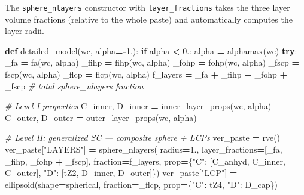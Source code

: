 \documentclass[
  a4paper,
  numbers=noendperiod,
  DIV=12]{scrreprt}
\newenvironment{Shaded}{\begin{snugshade}}{\end{snugshade}}
\newcommand{\CommentTok}[1]{\textcolor[rgb]{0.56,0.35,0.01}{\textit{#1}}}
\newcommand{\ControlFlowTok}[1]{\textcolor[rgb]{0.13,0.29,0.53}{\textbf{#1}}}
\newcommand{\FloatTok}[1]{\textcolor[rgb]{0.00,0.00,0.81}{#1}}
\newcommand{\KeywordTok}[1]{\textcolor[rgb]{0.13,0.29,0.53}{\textbf{#1}}}
\newcommand{\NormalTok}[1]{#1}
\newcommand{\OperatorTok}[1]{\textcolor[rgb]{0.81,0.36,0.00}{\textbf{#1}}}
\newcommand{\StringTok}[1]{\textcolor[rgb]{0.31,0.60,0.02}{#1}}
\begin{document}
The \texttt{sphere\_nlayers} constructor with \texttt{layer\_fractions}
takes the three layer volume fractions (relative to the whole paste) and
automatically computes the layer radii.

\begin{Shaded}
\begin{Highlighting}[]
\KeywordTok{def}\NormalTok{ detailed\_model(wc, alpha}\OperatorTok{={-}}\FloatTok{1.}\NormalTok{):}
    \ControlFlowTok{if}\NormalTok{ alpha }\OperatorTok{\textless{}} \FloatTok{0.}\NormalTok{: alpha }\OperatorTok{=}\NormalTok{ alphamax(wc)}
    \ControlFlowTok{try}\NormalTok{:}
\NormalTok{        \_fa   }\OperatorTok{=}\NormalTok{ fa(wc, alpha)}
\NormalTok{        \_fihp }\OperatorTok{=}\NormalTok{ fihp(wc, alpha)}
\NormalTok{        \_fohp }\OperatorTok{=}\NormalTok{ fohp(wc, alpha)}
\NormalTok{        \_fscp }\OperatorTok{=}\NormalTok{ fscp(wc, alpha)}
\NormalTok{        \_flcp }\OperatorTok{=}\NormalTok{ flcp(wc, alpha)}
\NormalTok{        f\_layers }\OperatorTok{=}\NormalTok{ \_fa }\OperatorTok{+}\NormalTok{ \_fihp }\OperatorTok{+}\NormalTok{ \_fohp }\OperatorTok{+}\NormalTok{ \_fscp  }\CommentTok{\# total sphere\_nlayers fraction}

        \CommentTok{\# Level I properties}
\NormalTok{        C\_inner, D\_inner }\OperatorTok{=}\NormalTok{ inner\_layer\_props(wc, alpha)}
\NormalTok{        C\_outer, D\_outer }\OperatorTok{=}\NormalTok{ outer\_layer\_props(wc, alpha)}

        \CommentTok{\# Level II: generalized SC — composite sphere + LCPs}
\NormalTok{        ver\_paste }\OperatorTok{=}\NormalTok{ rve()}
\NormalTok{        ver\_paste[}\StringTok{"LAYERS"}\NormalTok{] }\OperatorTok{=}\NormalTok{ sphere\_nlayers(}
\NormalTok{            radius}\OperatorTok{=}\FloatTok{1.}\NormalTok{,}
\NormalTok{            layer\_fractions}\OperatorTok{=}\NormalTok{[\_fa, \_fihp, \_fohp }\OperatorTok{+}\NormalTok{ \_fscp],}
\NormalTok{            fraction}\OperatorTok{=}\NormalTok{f\_layers,}
\NormalTok{            prop}\OperatorTok{=}\NormalTok{\{}\StringTok{"C"}\NormalTok{: [C\_anhyd, C\_inner, C\_outer],}
                  \StringTok{"D"}\NormalTok{: [tZ2,    D\_inner, D\_outer]\})}
\NormalTok{        ver\_paste[}\StringTok{"LCP"}\NormalTok{] }\OperatorTok{=}\NormalTok{ ellipsoid(shape}\OperatorTok{=}\NormalTok{spherical, fraction}\OperatorTok{=}\NormalTok{\_flcp,}
\NormalTok{                                     prop}\OperatorTok{=}\NormalTok{\{}\StringTok{"C"}\NormalTok{: tZ4, }\StringTok{"D"}\NormalTok{: D\_cap\})}


\end{Highlighting}
\end{Shaded}
\end{document}
